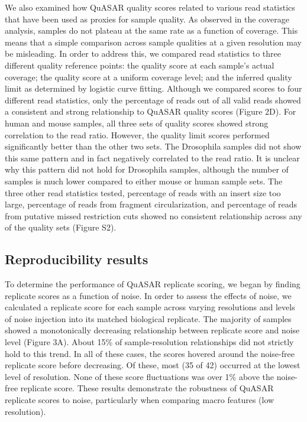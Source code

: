 We also examined how QuASAR quality scores related to various read statistics that have been used as proxies for sample quality. As observed in the coverage analysis, samples do not plateau at the same rate as a function of coverage. This means that a simple comparison across sample qualities at a given resolution may be misleading. In order to address this, we compared read statistics to three different quality reference points: the quality score at each sample's actual coverage; the quality score at a uniform coverage level; and the inferred quality limit as determined by logistic curve fitting. Although we compared scores to four different read statistics, only the percentage of \cis reads out of all valid reads showed a consistent and strong relationship to QuASAR quality scores (Figure 2D). For human and mouse samples, all three sets of quality scores showed strong correlation to the \cis read ratio. However, the quality limit scores performed significantly better than the other two sets. The Drosophila samples did not show this same pattern and in fact negatively correlated to the \cis read ratio. It is unclear why this pattern did not hold for Drosophila samples, although the number of samples is much lower compared to either mouse or human sample sets. The three other read statistics tested, percentage of reads with an insert size too large, percentage of reads from fragment circularization, and percentage of reads from putative missed restriction cuts showed no consistent relationship across any of the quality sets (Figure S2).

\subsection{Reproducibility results}

To determine the performance of QuASAR replicate scoring, we began by finding replicate scores as a function of noise. In order to assess the effects of noise, we calculated a replicate score for each sample across varying resolutions and levels of noise injection into its matched biological replicate. The majority of samples showed a monotonically decreasing relationship between replicate score and noise level (Figure 3A). About 15\% of sample-resolution relationships did not strictly hold to this trend. In all of these cases, the scores hovered around the noise-free replicate score before decreasing. Of these, most (35 of 42) occurred at the lowest level of resolution. None of these score fluctuations was over 1\% above the noise-free replicate score. These results demonstrate the robustness of QuASAR replicate scores to noise, particularly when comparing macro features (low resolution).

